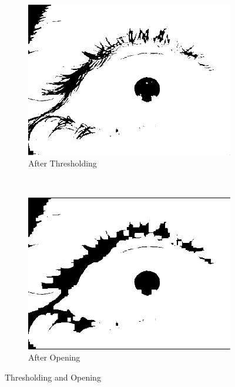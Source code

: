 \begin{figure}[h!]
	\centering
	
	\begin{subfigure}[b]{0.5\textwidth}
		\centering
		\includegraphics[width=\textwidth]{final/images/thresh.png}
		\caption{After Thresholding}
		\label{subfig:thresh}
	\end{subfigure}%
	~
	\begin{subfigure}[b]{0.5\textwidth}
		\centering
		\includegraphics[width=\textwidth]{final/images/open.png}
		\caption{After Opening}
		\label{subfig:open}
	\end{subfigure}
	
	\caption{Thresholding and Opening}
	\label{fig:threshopen}
\end{figure}

